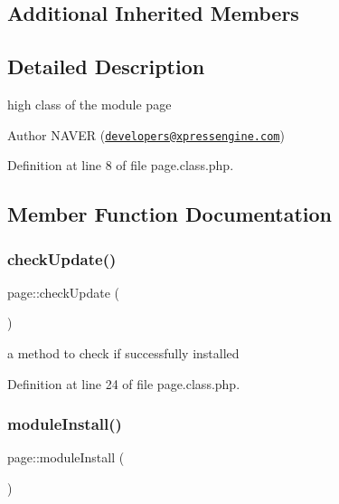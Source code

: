\subsection*{Additional Inherited Members}


\subsection{Detailed Description}
high class of the module page 

\begin{DoxyAuthor}{Author}
N\+A\+V\+ER (\href{mailto:developers@xpressengine.com}{\tt developers@xpressengine.\+com}) 
\end{DoxyAuthor}


Definition at line 8 of file page.\+class.\+php.



\subsection{Member Function Documentation}
\mbox{\label{classpage_ad635ecff86f3837caf39e0a13f714321}} 
\subsubsection{\texorpdfstring{check\+Update()}{checkUpdate()}}
{\footnotesize\ttfamily page\+::check\+Update (\begin{DoxyParamCaption}{ }\end{DoxyParamCaption})}



a method to check if successfully installed 



Definition at line 24 of file page.\+class.\+php.

\mbox{\label{classpage_ae25169ce6659a05e22c369edcdef2f16}} 
\subsubsection{\texorpdfstring{module\+Install()}{moduleInstall()}}
{\footnotesize\ttfamily page\+::module\+Install (\begin{DoxyParamCaption}{ }\end{DoxyParamCaption})}



